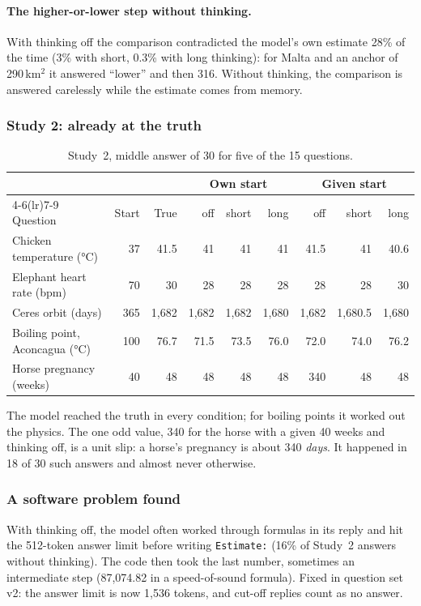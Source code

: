 \documentclass[11pt,a4paper]{article}
\begin{document}
\paragraph{The higher-or-lower step without thinking.} With thinking off the comparison contradicted the model's own estimate 28\% of the time (3\% with short, 0.3\% with long thinking): for Malta and an anchor of 290\,km$^2$ it answered \enquote{lower} and then 316. Without thinking, the comparison is answered carelessly while the estimate comes from memory.

\subsubsection{Study 2: already at the truth}

\begin{table}[ht]
\centering\small
\begin{tabular}{@{}lrrrrrrrr@{}}
\toprule
 & & & \multicolumn{3}{c}{Own start} & \multicolumn{3}{c}{Given start} \\
\cmidrule(lr){4-6}\cmidrule(lr){7-9}
Question & Start & True & off & short & long & off & short & long \\
\midrule
Chicken temperature (°C) & 37 & 41.5 & 41 & 41 & 41 & 41.5 & 41 & 40.6 \\
Elephant heart rate (bpm) & 70 & 30 & 28 & 28 & 28 & 28 & 28 & 30 \\
Ceres orbit (days) & 365 & 1,682 & 1,682 & 1,682 & 1,680 & 1,682 & 1,680.5 & 1,680 \\
Boiling point, Aconcagua (°C) & 100 & 76.7 & 71.5 & 73.5 & 76.0 & 72.0 & 74.0 & 76.2 \\
Horse pregnancy (weeks) & 40 & 48 & 48 & 48 & 48 & 340 & 48 & 48 \\
\bottomrule
\end{tabular}
\caption{Study~2, middle answer of 30 for five of the 15 questions.}
\end{table}

The model reached the truth in every condition; for boiling points it worked out the physics. The one odd value, 340 for the horse with a given 40 weeks and thinking off, is a unit slip: a horse's pregnancy is about 340 \emph{days}. It happened in 18 of 30 such answers and almost never otherwise.

\subsubsection{A software problem found}
With thinking off, the model often worked through formulas in its reply and hit the 512-token answer limit before writing \texttt{Estimate:} (16\% of Study~2 answers without thinking). The code then took the last number, sometimes an intermediate step (87,074.82 in a speed-of-sound formula). Fixed in question set v2: the answer limit is now 1,536 tokens, and cut-off replies count as no answer.
\end{document}
